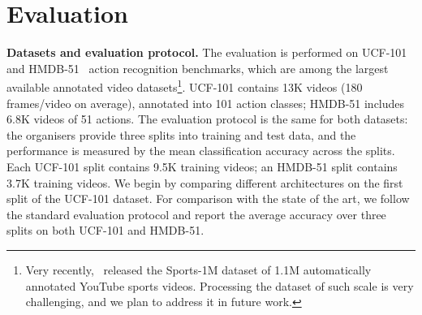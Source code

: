 \documentclass{article} %
\begin{document}
\section{Evaluation}
\label{sec:eval}
\noindent\textbf{Datasets and evaluation protocol.}
The evaluation is performed on UCF-101~\cite{Soomro12} and \mbox{HMDB-51}~\cite{Kuehne11} action recognition benchmarks, which are among the largest available annotated video
datasets\footnote{Very recently,~\cite{Karpathy14} released the Sports-1M dataset of 1.1M automatically annotated YouTube sports videos. 
Processing the dataset of such scale is very challenging, and we plan to address it in future work.}. 
UCF-101 contains 13K videos (180 frames/video on average), annotated into 101 action classes; HMDB-51 includes 6.8K videos of 51 actions. 
The evaluation protocol is the same for both datasets: the organisers
provide three splits into training and test data, and the performance is measured by the mean classification accuracy across the splits. Each UCF-101 split contains 9.5K training
videos; an HMDB-51 split contains 3.7K training videos.
We begin by comparing different architectures on the first split of the UCF-101 dataset.
For comparison with the state of the art, we follow the standard evaluation protocol and report the average accuracy over three splits on both UCF-101 and HMDB-51. 
\end{document}
